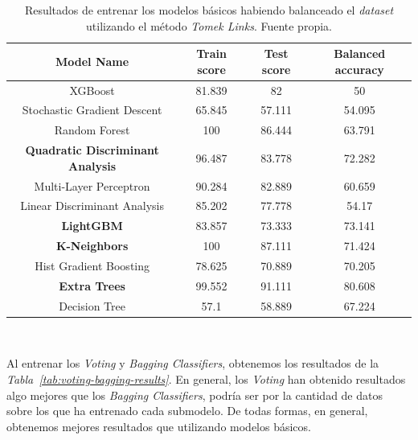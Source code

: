 \begin{table}[!ht]
    \centering
    \begin{tabular}{|c|ccc|}
    \hline
        Model Name & Train score & Test score & Balanced accuracy \\ \hline
        XGBoost & 81.839 & 82 & 50 \\ 
        Stochastic Gradient Descent & 65.845 & 57.111 & 54.095 \\ 
        Random Forest & 100 & 86.444 & 63.791 \\ 
        \textbf{Quadratic Discriminant Analysis} & 96.487 & 83.778 & 72.282 \\ 
        Multi-Layer Perceptron & 90.284 & 82.889 & 60.659 \\ 
        Linear Discriminant Analysis & 85.202 & 77.778 & 54.17 \\ 
        \textbf{LightGBM} & 83.857 & 73.333 & 73.141 \\ 
        \textbf{K-Neighbors} & 100 & 87.111 & 71.424 \\ 
        Hist Gradient Boosting & 78.625 & 70.889 & 70.205 \\ 
        \textbf{Extra Trees} & 99.552 & 91.111 & 80.608 \\ 
        Decision Tree & 57.1 & 58.889 & 67.224 \\ \hline
    \end{tabular}
    \caption{Resultados de entrenar los modelos básicos habiendo balanceado el \textit{dataset} utilizando el método \textit{Tomek Links}. Fuente propia.}\ \label{tab:tomeklinks-basic-training}
\end{table}

Al entrenar los \textit{Voting} y \textit{Bagging Classifiers}, obtenemos los resultados de la \textit{Tabla\ \ref{tab:voting-bagging-results}}. En general, los \textit{Voting} han obtenido resultados algo mejores que los \textit{Bagging Classifiers}, podría ser por la cantidad de datos sobre los que ha entrenado cada submodelo. De todas formas, en general, obtenemos mejores resultados que utilizando modelos básicos.

